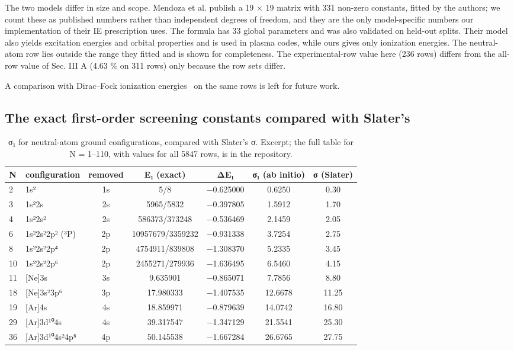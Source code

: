 \documentclass[aps,pra,preprint,notitlepage,superscriptaddress,amsmath,amssymb]{revtex4-2}
\begin{document}
The two models differ in size and scope. Mendoza et al. publish a 19 × 19 matrix with 331 non-zero constants, fitted by the authors; we count these as published numbers rather than independent degrees of freedom, and they are the only model-specific numbers our implementation of their IE prescription uses. The formula has 33 global parameters and was also validated on held-out splits. Their model also yields excitation energies and orbital properties and is used in plasma codes, while ours gives only ionization energies. The neutral-atom row lies outside the range they fitted and is shown for completeness. The experimental-row value here (236 rows) differs from the all-row value of Sec. III A (4.63 \% on 311 rows) only because the row sets differ.


A comparison with Dirac–Fock ionization energies~\cite{r29} on the same rows is left for future work.


\subsection{The exact first-order screening constants compared with Slater's}

\begin{table}[htbp]
\caption{σ₁ for neutral-atom ground configurations, compared with Slater's σ. Excerpt; the full table for N = 1–110, with values for all 5847 rows, is in the repository.}
\footnotesize\linespread{1}\selectfont\setlength{\tabcolsep}{5pt}\renewcommand{\arraystretch}{1.1}
\begin{adjustbox}{max width=\linewidth}
\begin{tabular}{llccccc}
\hline\hline
N & configuration & removed & E₁ (exact) & ΔE₁ & σ₁ (ab initio) & σ (Slater) \\
\hline
2 & 1s² & 1s & 5/8 & −0.625000 & 0.6250 & 0.30 \\
3 & 1s²2s & 2s & 5965/5832 & −0.397805 & 1.5912 & 1.70 \\
4 & 1s²2s² & 2s & 586373/373248 & −0.536469 & 2.1459 & 2.05 \\
6 & 1s²2s²2p² (³P) & 2p & 10957679/3359232 & −0.931338 & 3.7254 & 2.75 \\
8 & 1s²2s²2p⁴ & 2p & 4754911/839808 & −1.308370 & 5.2335 & 3.45 \\
10 & 1s²2s²2p⁶ & 2p & 2455271/279936 & −1.636495 & 6.5460 & 4.15 \\
11 & [Ne]3s & 3s & 9.635901 & −0.865071 & 7.7856 & 8.80 \\
18 & [Ne]3s²3p⁶ & 3p & 17.980333 & −1.407535 & 12.6678 & 11.25 \\
19 & [Ar]4s & 4s & 18.859971 & −0.879639 & 14.0742 & 16.80 \\
29 & [Ar]3d¹⁰4s & 4s & 39.317547 & −1.347129 & 21.5541 & 25.30 \\
36 & [Ar]3d¹⁰4s²4p⁶ & 4p & 50.145538 & −1.667284 & 26.6765 & 27.75 \\
\hline\hline
\end{tabular}
\end{adjustbox}
\end{table}
\end{document}
